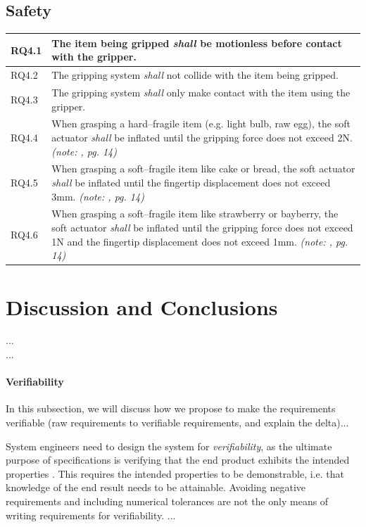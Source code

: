 \documentclass[lettersize,journal]{IEEEtran}
\begin{document}
\subsection{Safety}\label{safety}
\begin{center}
	\begin{tabular}{|p{7mm}|p{72mm}|}
		\hline
		RQ4.1 & The item being gripped \emph{shall} be motionless before contact with the gripper.   \\ 
		\hline
		RQ4.2 & The gripping system \emph{shall} not collide with the item being gripped. \\ 
		\hline
		RQ4.3 & The gripping system \emph{shall} only make contact with the item using the gripper.\\
		\hline
		RQ4.4 & When grasping a hard–fragile item (e.g. light bulb, raw egg), the soft actuator \emph{shall} be inflated until the gripping force does not exceed 2N. \emph{(note: \cite{Cheng2021}, pg. 14)}\\
		\hline
		RQ4.5 & When grasping a soft–fragile item like cake or bread, the soft actuator \emph{shall} be inflated until the fingertip displacement does not exceed 3mm. \emph{(note: \cite{Cheng2021}, pg. 14)}\\
		\hline
		RQ4.6 & When grasping a soft–fragile item like strawberry or bayberry, the soft actuator \emph{shall} be inflated until the gripping force does not exceed 1N and the fingertip displacement does not exceed 1mm. \emph{(note: \cite{Cheng2021}, pg. 14)}\\	[1ex] 
		\hline
	\end{tabular}
\end{center}

\section{Discussion and Conclusions} \label{discussion-conclusions}

...\\

...
\paragraph{Verifiability} 
In this subsection, we will discuss how we propose to make the requirements verifiable (raw requirements to verifiable requirements, and explain the delta)...

System engineers need to design the system for \textit{verifiability}, as the ultimate purpose of specifications is verifying that the end product exhibits the intended properties \cite{Gerson1993}. This requires the intended properties to be demonstrable, i.e. that knowledge of the end result needs to be attainable. Avoiding negative requirements and including numerical tolerances are not the only means of writing requirements for verifiability.  ...
\end{document}
